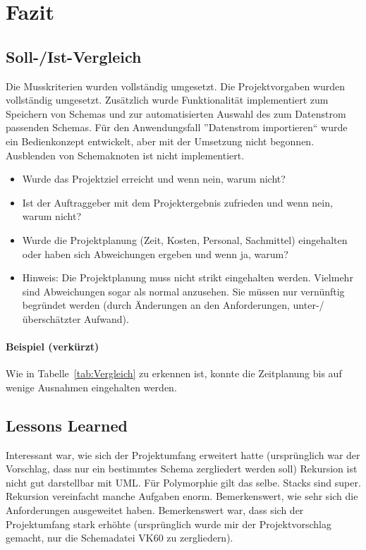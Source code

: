 \section{Fazit} 
\label{sec:Fazit}

\subsection{Soll-/Ist-Vergleich}
\label{sec:SollIstVergleich}
Die Musskriterien wurden vollständig umgesetzt. Die Projektvorgaben wurden vollständig umgesetzt.
Zusätzlich wurde Funktionalität implementiert zum Speichern von Schemas und zur automatisierten Auswahl des zum Datenstrom passenden Schemas.
Für den Anwendungsfall ''Datenstrom importieren`` wurde ein Bedienkonzept entwickelt, aber mit der Umsetzung nicht begonnen. 
Ausblenden von Schemaknoten ist nicht implementiert.


\begin{itemize}
	\item Wurde das Projektziel erreicht und wenn nein, warum nicht?
	\item Ist der Auftraggeber mit dem Projektergebnis zufrieden und wenn nein, warum nicht?
	\item Wurde die Projektplanung (Zeit, Kosten, Personal, Sachmittel) eingehalten oder haben sich Abweichungen ergeben und wenn ja, warum?
	\item Hinweis: Die Projektplanung muss nicht strikt eingehalten werden. Vielmehr sind Abweichungen sogar als normal anzusehen. Sie müssen nur vernünftig begründet werden (\zB durch Änderungen an den Anforderungen, unter-/überschätzter Aufwand).
\end{itemize}

\paragraph{Beispiel (verkürzt)}
Wie in Tabelle~\ref{tab:Vergleich} zu erkennen ist, konnte die Zeitplanung bis auf wenige Ausnahmen eingehalten werden.


\subsection{Lessons Learned}
\label{sec:LessonsLearned}
Interessant war, wie sich der Projektumfang erweitert hatte (ursprünglich war der Vorschlag, dass nur ein bestimmtes Schema zergliedert werden soll)
Rekursion ist nicht gut darstellbar mit UML. Für Polymorphie gilt das selbe. Stacks sind super. Rekursion vereinfacht manche Aufgaben enorm. Bemerkenswert, wie sehr sich die Anforderungen ausgeweitet haben.
Bemerkenswert war, dass sich der Projektumfang stark erhöhte (ursprünglich wurde mir der Projektvorschlag gemacht, nur die Schemadatei VK60 zu zergliedern).



